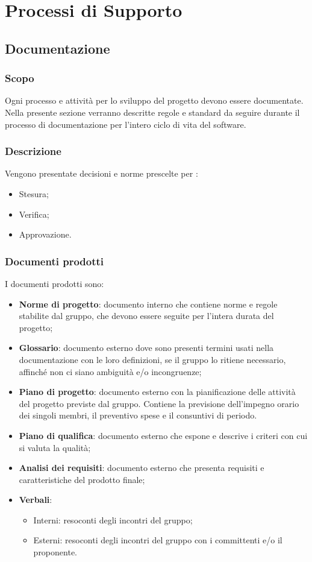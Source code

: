 \section{Processi di Supporto}
\subsection{Documentazione}
\subsubsection{Scopo}
Ogni processo e attività per lo sviluppo del progetto devono essere documentate. Nella presente sezione verranno descritte regole e standard da seguire durante il processo di documentazione per l’intero ciclo di vita del software.

\subsubsection{Descrizione}
Vengono presentate decisioni e norme prescelte per :
\begin{itemize}
  \item Stesura;
  \item Verifica;
  \item Approvazione.
\end{itemize}

\subsubsection{Documenti prodotti}
I documenti prodotti sono:
\begin{itemize}
  \item \textbf{Norme di progetto}: documento interno che contiene norme e regole stabilite dal gruppo, che devono essere seguite per l’intera durata del progetto;
  \item \textbf{Glossario}: documento esterno dove sono presenti termini usati nella documentazione con le loro definizioni, se il gruppo lo ritiene necessario, affinché non ci siano ambiguità e/o incongruenze;
  \item \textbf{Piano di progetto}: documento esterno con la pianificazione delle attività del progetto previste dal gruppo. Contiene la previsione dell’impegno orario dei singoli membri, il preventivo spese e il consuntivi di periodo.
  \item \textbf{Piano di qualifica}: documento esterno che espone e descrive i criteri con cui si valuta la qualità;
  \item \textbf{Analisi dei requisiti}: documento esterno che presenta requisiti e caratteristiche del prodotto finale;
  \item \textbf{Verbali}:
  \begin{itemize}
  		\item Interni: resoconti degli incontri del gruppo;
  		\item Esterni: resoconti degli incontri del gruppo con i committenti e/o il proponente.
	\end{itemize}
\end{itemize}

